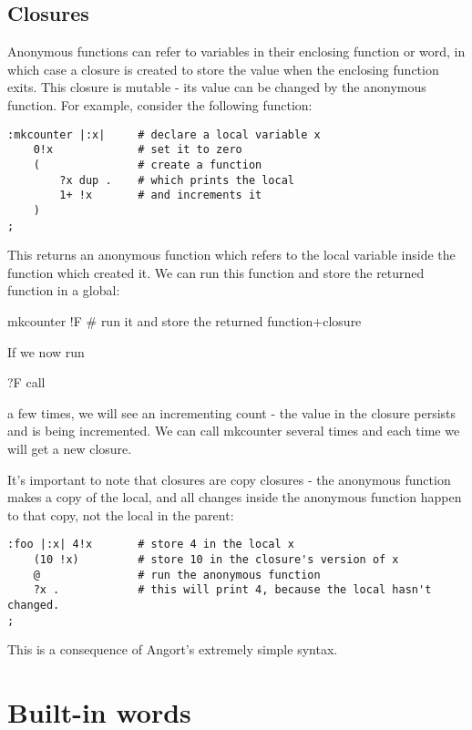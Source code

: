 \subsection{Closures}
Anonymous functions can refer to variables in their enclosing function or
word, in which case a closure is created to store the value when the enclosing
function exits. This closure is mutable - its value can be changed by the
anonymous function. For example, consider the following function:

\begin{lstlisting}
:mkcounter |:x|     # declare a local variable x
    0!x             # set it to zero
    (               # create a function
        ?x dup .    # which prints the local
        1+ !x       # and increments it
    )
;
\end{lstlisting}
This returns an anonymous function which refers to the local variable
inside the function which created it. We can run this function
and store the returned function in a global:

\begin{v}
mkcounter !F    # run it and store the returned function+closure
\end{v}
If we now run
\begin{v}
    ?F call
\end{v}
a few times, we will see an incrementing count - the value in the closure
persists and is being incremented. We can call mkcounter several times and
each time we will get a new closure.

It's important to note that closures are copy closures - the anonymous
function makes a copy of the local, and all changes inside the anonymous
function happen to that copy, not the local in the parent:

\begin{lstlisting}
:foo |:x| 4!x       # store 4 in the local x
    (10 !x)         # store 10 in the closure's version of x
    @               # run the anonymous function
    ?x .            # this will print 4, because the local hasn't changed.
;
\end{lstlisting}
This is a consequence of Angort's extremely simple syntax.
















\section{Built-in words}

